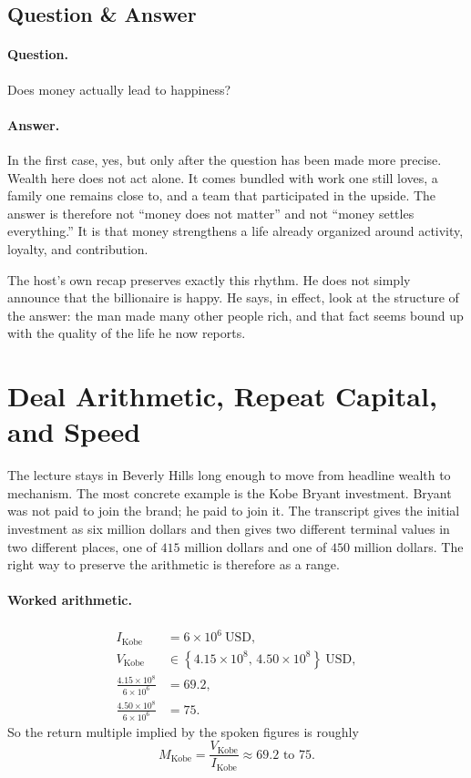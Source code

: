 \subsection{Question \& Answer}

\paragraph{Question.} Does money actually lead to happiness?

\paragraph{Answer.} In the first case, yes, but only after the question has been made more precise. Wealth here does not act alone. It comes bundled with work one still loves, a family one remains close to, and a team that participated in the upside. The answer is therefore not ``money does not matter'' and not ``money settles everything.'' It is that money strengthens a life already organized around activity, loyalty, and contribution.

The host's own recap preserves exactly this rhythm. He does not simply announce that the billionaire is happy. He says, in effect, look at the structure of the answer: the man made many other people rich, and that fact seems bound up with the quality of the life he now reports.

\section{Deal Arithmetic, Repeat Capital, and Speed}

The lecture stays in Beverly Hills long enough to move from headline wealth to mechanism. The most concrete example is the Kobe Bryant investment. Bryant was not paid to join the brand; he paid to join it. The transcript gives the initial investment as six million dollars and then gives two different terminal values in two different places, one of \(415\) million dollars and one of \(450\) million dollars. The right way to preserve the arithmetic is therefore as a range.

\paragraph{Worked arithmetic.}
\begin{align}
I_{\text{Kobe}} &= 6 \times 10^{6}\ \mathrm{USD},\\
V_{\text{Kobe}} &\in \left\{4.15 \times 10^{8},\,4.50 \times 10^{8}\right\}\ \mathrm{USD},\\
\frac{4.15 \times 10^{8}}{6 \times 10^{6}} &= 69.2,\\
\frac{4.50 \times 10^{8}}{6 \times 10^{6}} &= 75.
\end{align}
So the return multiple implied by the spoken figures is roughly
\begin{equation}
M_{\text{Kobe}}=\frac{V_{\text{Kobe}}}{I_{\text{Kobe}}}\approx 69.2 \text{ to } 75.
\end{equation}

